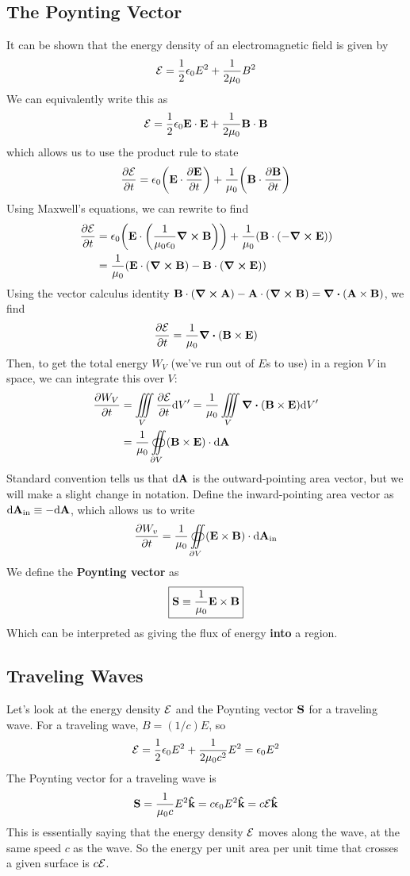 \subsection*{The Poynting Vector}
It can be shown that the energy density of an electromagnetic field is given by
\[ \mathcal{E} = \frac{1}{2}\epsilon_0 E^2 + \frac{1}{2\mu_0} B^2\]
We can equivalently write this as 
\[ \mathcal{E} = \frac{1}{2}\epsilon_0 \mathbf{E} \cdot \mathbf{E} + \frac{1}{2\mu_0} \mathbf{B} \cdot \mathbf{B}\]
which allows us to use the product rule to state
\begin{align*}
    \pdv{\mcl E}{t} = \epsilon_0 \pqty{\mbf E \cdot \pdv{\mbf E}{t}} + \frac{1}{\mu_0}\pqty{\mbf B \cdot \pdv{\mbf B}{t}}
\end{align*}
Using Maxwell's equations, we can rewrite to find
\begin{align*}
    \pdv{\mcl E}{t} &= \epsilon_0\pqty{\mbf E \cdot \pqty{\frac{1}{\mu_0\epsilon_0}\curl \mbf B}} + \frac{1}{\mu_0}\pqty{\mbf B \cdot (-\curl \mbf E)} \\
    &= \frac{1}{\mu_0} \pqty{\mbf E \cdot (\curl \mbf B) - \mbf B \cdot (\curl \mbf E)}
\end{align*}
Using the vector calculus identity $\mathbf{B}\cdot(\curl \mathbf{A}) - \mathbf{A} \cdot(\curl \mathbf{B}) = \div(\mathbf{A}\times \mathbf{B})$, we find
\[ \pdv{\mathcal{E}}{t} = \frac{1}{\mu_0} \div(\mathbf{B} \times \mathbf{E})\]
Then, to get the total energy $W_V$ (we've run out of $E$s to use) in a region $V$ in space, we can integrate this over $V$:
\begin{align*}
    \pdv{W_V}{t} &= \iiint\limits_V \pdv{\mathcal{E}}{t} \dd V' = \frac{1}{\mu_0}\iiint\limits_V \div(\mathbf{B}\times \mathbf{E}) \dd V' \\
    &= \frac{1}{\mu_0}\oiint\limits_{\partial V} (\mathbf{B} \times \mathbf{E})\cdot \dd \mathbf{A}
\end{align*}
Standard convention tells us that $\dd \mathbf{A}$ is the outward-pointing area vector, but we will make a slight change in notation. Define the inward-pointing area vector as $\dd \mathbf{A}_\text{in} \equiv -\dd \mathbf{A}$, which allows us to write
\[ \pdv{W_v}{t} = \frac{1}{\mu_0}\oiint\limits_{\partial V} (\mathbf{E}\times \mathbf{B})\cdot \dd \mathbf{A}_\text{in}\]
We define the \textbf{Poynting vector} as
\[ \boxed{\mathbf{S} \equiv \frac{1}{\mu_0} \mathbf{E}\times \mathbf{B}}\]
Which can be interpreted as giving the flux of energy \textbf{into} a region.
\subsection*{Traveling Waves}
Let's look at the energy density $\mathcal{E}$ and the Poynting vector $\mathbf{S}$ for a traveling wave. For a traveling wave, $B = (1/c)E$, so
\[ \mathcal{E} = \frac{1}{2}\epsilon_0 E^2 + \frac{1}{2\mu_0 c^2} E^2 = \epsilon_0E^2 \]
The Poynting vector for a traveling wave is 
\[ \mathbf{S} = \frac{1}{\mu_0 c} E^2   \mathbf{\hat k} = c\epsilon_0 E^2 \mathbf{\hat k} = c\mathcal{E} \mathbf{\hat k} \]
This is essentially saying that the energy density $\mathcal{E}$ moves along the wave, at the same speed $c$ as the wave. So the energy per unit area per unit time that crosses a given surface is $c\mathcal{E}$.

